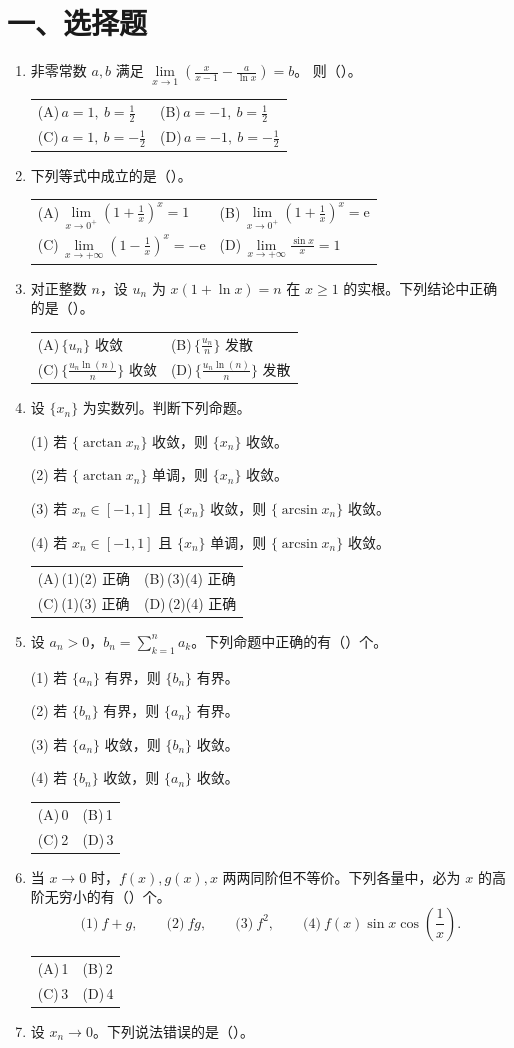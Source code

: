 \documentclass[UTF8,a4paper,zihao=-4,fontset=fandol]{ctexart}
\makeatletter
\renewcommand{\lim}{\operatorname*{lim}\limits}
\newcommand{\choices}[4]{%
  \par\noindent\begin{tabularx}{\linewidth}{@{}X@{\hspace{1em}}X@{}}
    (A)\,#1 & (B)\,#2 \\
    (C)\,#3 & (D)\,#4
  \end{tabularx}\par}
\makeatother
\begin{document}
\section*{一、选择题}
\begin{enumerate}
\item 非零常数 $a,b$ 满足 $\displaystyle\lim_{x\to1}\left(\frac{x}{x-1}-\frac a{\ln x}\right)=b$。
则（\quad）。
\choices{$a=1,\ b=\frac{1}{2}$}{$a=-1,\ b=\frac{1}{2}$}{$a=1,\ b=-\frac{1}{2}$}{$a=-1,\ b=-\frac{1}{2}$}
\item 下列等式中成立的是（\quad）。
\choices{$\displaystyle\lim_{x\to0^+}(1+\frac{1}{x})^x=1$}{$\displaystyle\lim_{x\to0^+}(1+\frac{1}{x})^x=\mathrm e$}
{$\displaystyle\lim_{x\to+\infty}(1-\frac{1}{x})^x=-\mathrm e$}{$\displaystyle\lim_{x\to+\infty}\frac{\sin x}{x}=1$}
\item 对正整数 $n$，设 $u_n$ 为 $x(1+\ln x)=n$ 在 $x\ge1$ 的实根。下列结论中正确的是（\quad）。
\choices{$\{u_n\}$ 收敛}{$\{\frac{u_n}{n}\}$ 发散}{$\{\frac{u_n\ln(n)}{n}\}$ 收敛}{$\{\frac{u_n\ln(n)}{n}\}$ 发散}
\item 设 $\{x_n\}$ 为实数列。判断下列命题。
\par (1) 若 $\{\arctan x_n\}$ 收敛，则 $\{x_n\}$ 收敛。
\par (2) 若 $\{\arctan x_n\}$ 单调，则 $\{x_n\}$ 收敛。
\par (3) 若 $x_n\in[-1,1]$ 且 $\{x_n\}$ 收敛，则 $\{\arcsin x_n\}$ 收敛。
\par (4) 若 $x_n\in[-1,1]$ 且 $\{x_n\}$ 单调，则 $\{\arcsin x_n\}$ 收敛。
\choices{(1)(2) 正确}{(3)(4) 正确}{(1)(3) 正确}{(2)(4) 正确}
\item 设 $a_n>0$，$b_n=\sum_{k=1}^n a_k$。下列命题中正确的有（\quad）个。
\par (1) 若 $\{a_n\}$ 有界，则 $\{b_n\}$ 有界。
\par (2) 若 $\{b_n\}$ 有界，则 $\{a_n\}$ 有界。
\par (3) 若 $\{a_n\}$ 收敛，则 $\{b_n\}$ 收敛。
\par (4) 若 $\{b_n\}$ 收敛，则 $\{a_n\}$ 收敛。
\choices{0}{1}{2}{3}
\item 当 $x\to0$ 时，$f(x),g(x),x$ 两两同阶但不等价。下列各量中，必为 $x$ 的高阶无穷小的有（\quad）个。
\[
 \text{(1)}\ f+g,\qquad\text{(2)}\ fg,\qquad
 \text{(3)}\ f^2,\qquad\text{(4)}\ f(x)\sin x\cos(\frac{1}{x}).
\]
\choices{1}{2}{3}{4}
\item 设 $x_n\to0$。下列说法错误的是（\quad）。

\end{enumerate}
\end{document}

